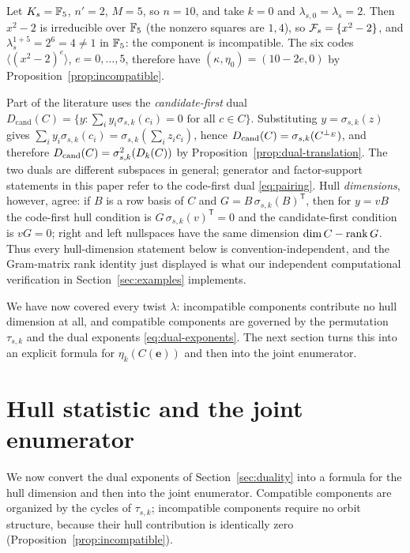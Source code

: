 \begin{example}\label{ex:incompatible}
Let $K_s=\mathbb F_5$, $n'=2$, $M=5$, so $n=10$, and take $k=0$ and
$\lambda_{s,0}=\lambda_s=2$.  Then $x^2-2$ is irreducible over $\mathbb F_5$ (the
nonzero squares are $1,4$), so $\mathcal F_s=\{x^2-2\}$, and
$\lambda_s^{1+5}=2^6=4\neq1$ in $\mathbb F_5$: the component is incompatible.  The six
codes $\langle(x^2-2)^e\rangle$, $e=0,\ldots,5$, therefore have
$(\kappa,\eta_0)=(10-2e,0)$ by Proposition~\ref{prop:incompatible}.
\end{example}

\begin{remark}\label{rem:candidate}
Part of the literature uses the \emph{candidate-first} dual
$D_{\mathrm{cand}}(C)=\{y:\sum_i y_i\sigma_{s,k}(c_i)=0\text{ for all }c\in C\}$.
Substituting $y=\sigma_{s,k}(z)$ gives
$\sum_i y_i\sigma_{s,k}(c_i)=\sigma_{s,k}(\sum_i z_ic_i)$, hence
$D_{\mathrm{cand}}(C)=\sigma_{s,k}(C^{\perp_{E}})$, and therefore
$D_{\mathrm{cand}}(C)=\sigma_{s,k}^2(D_k(C))$ by
Proposition~\ref{prop:dual-translation}.  The two duals are different subspaces
in general; generator and factor-support statements in this paper refer to the
code-first dual \eqref{eq:pairing}.  Hull \emph{dimensions}, however, agree:
if $B$ is a row basis of $C$ and $G=B\,\sigma_{s,k}(B)^{\mathsf T}$, then for
$y=vB$ the code-first hull condition is $G\,\sigma_{s,k}(v)^{\mathsf T}=0$ and
the candidate-first condition is $vG=0$; right and left nullspaces have the
same dimension $\dim C-\operatorname{rank} G$.  Thus every hull-dimension statement below is
convention-independent, and the Gram-matrix rank identity just displayed is
what our independent computational verification in
Section~\ref{sec:examples} implements.
\end{remark}

We have now covered every twist $\lambda$: incompatible components contribute
no hull dimension at all, and compatible components are governed by the
permutation $\tau_{s,k}$ and the dual exponents
\eqref{eq:dual-exponents}.  The next section turns this into an explicit
formula for $\eta_k(C(\mathbf{e}))$ and then into the joint enumerator.

\section{Hull statistic and the joint enumerator}\label{sec:enumerator}

We now convert the dual exponents of Section~\ref{sec:duality} into a formula
for the hull dimension and then into the joint enumerator.  Compatible
components are organized by the cycles of $\tau_{s,k}$; incompatible components
require no orbit structure, because their hull contribution is identically zero
(Proposition~\ref{prop:incompatible}).

